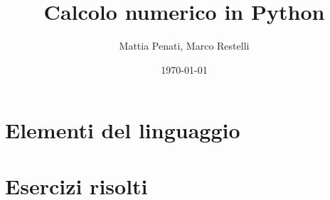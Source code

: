 \documentclass[
  a4paper,
  10pt,
  language=italian,
]{pynum}
\title{Calcolo numerico in Python}
\author{Mattia Penati, Marco Restelli}
\date{\today}
\begin{document}
  \begin{titlingpage}
    \maketitle
  \end{titlingpage}

  \frontmatter
    \tableofcontents

  \mainmatter
    \part{Elementi del linguaggio \python}
      
      

    \part{Esercizi risolti}

  \backmatter
    \printbibliography
    \printindex
\end{document}
